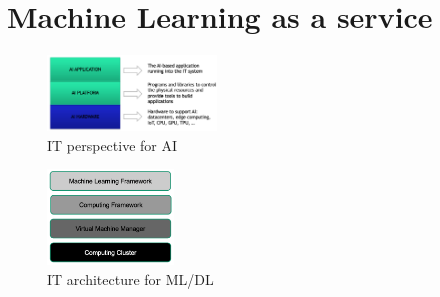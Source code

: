 \documentclass[10pt, oneside]{article}
\begin{document}
\newpage
\section{Machine Learning as a service}
\begin{multicols}{2}
    \begin{figure}[H]
        \begin{center}
        \includegraphics[width=0.4\textwidth]{img/img53.png}
        \caption{IT perspective for AI}
        \label{fig:IT perspective for AI}
        \end{center}
    \end{figure}
    \columnbreak
    \begin{figure}[H]
        \begin{center}
        \includegraphics[width=0.3\textwidth]{img/img54.png}
        \caption{IT architecture for ML/DL}
        \label{fig:IT architecture for ML/DL}
        \end{center}
    \end{figure}
\end{multicols}
\end{document}
